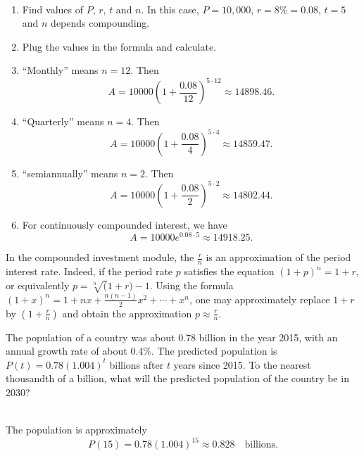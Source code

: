 \documentclass[en,11pt]{elegantbook}
\newcommand{\size}[2]{{\fontsize{#1}{0}\selectfont#2}}
\newenvironment{rmdnote}{
	\vspace*{0.5\baselineskip}
    \par\noindent
    \makebox[-3pt][r]{\color{red!90}\size{8}{\textdbend}\,\,}
    \begin{tcolorbox}[
    title={\textbf{\color{second}Note}},
    title style={left color=blue!10!green!20!white,right color=yellow!20!blue!20!white},
    colback=red!10!white,
    ]
    \itshape
}{
    \end{tcolorbox}
    \par\ignorespacesafterend
}
\let\BeginKnitrBlock\begin \let\EndKnitrBlock\end
\begin{document}
\BeginKnitrBlock{solution}
{}\\

\begin{enumerate}
\def\labelenumi{\arabic{enumi}.}

\item
  Find values of \(P\), \(r\), \(t\) and \(n\). In this case, \(P=10,000\), \(r=8\%=0.08\), \(t=5\) and \(n\) depends compounding.
\item
  Plug the values in the formula and calculate.
\item
  ``Monthly'' means \(n=12\). Then
  \[
   A=10000\left(1+\frac{0.08}{12}\right)^{5\cdot 12}\approx 14898.46.
   \]
\item
  ``Quarterly'' means \(n=4\). Then
  \[
   A=10000\left(1+\frac{0.08}{4}\right)^{5\cdot 4}\approx 14859.47.
   \]
\item
  ``semiannually'' means \(n=2\). Then
  \[
   A=10000\left(1+\frac{0.08}{2}\right)^{5\cdot 2}\approx 14802.44.
   \]
\item
  For continuously compounded interest, we have
  \[
   A=10000e^{0.08\cdot 5}\approx 14918.25.
   \]
\end{enumerate}
\EndKnitrBlock{solution}

\begin{rmdnote}

In the compounded investment module, the \(\frac rn\) is an approximation of the period interest rate. Indeed, if the period rate \(p\) satisfies the equation \((1+p)^n=1+r\), or equivalently \(p=\sqrt[n](1+r) - 1\). Using the formula \((1+x)^n=1+nx+\frac{n(n-1)}{2}x^2+\cdots +x^n\), one may approximately replace \(1+r\) by \((1+\frac rn)\) and obtain the approximation \(p\approx \frac rn\).

\end{rmdnote}

\BeginKnitrBlock{example}
\protect\hypertarget{exm:unnamed-chunk-280}{}{\label{exm:unnamed-chunk-280} }
The population of a country was about 0.78 billion in the year 2015, with an annual growth rate of about 0.4\%.
The predicted population is \(P(t)=0.78(1.004)^t\) billions after \(t\) years since 2015.
To the nearest thousandth of a billion, what will the predicted population of the country be in 2030?
\EndKnitrBlock{example}

\BeginKnitrBlock{solution}
{}\\

The population is approximately
\[
P(15)=0.78(1.004)^{15}\approx 0.828 \quad \text{billions}.
\]
\EndKnitrBlock{solution}
\end{document}
